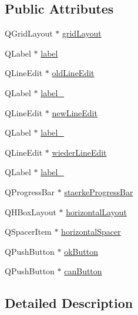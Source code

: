 \subsection*{Public Attributes}
\begin{CompactItemize}
\item 
QGridLayout $\ast$ \hyperlink{class_ui___password_change_dialog_class_69b4119ff485b44f00df3cc875fa50da}{gridLayout}
\item 
QLabel $\ast$ \hyperlink{class_ui___password_change_dialog_class_71666212d2d80702e6b969dc33c393b8}{label}
\item 
QLineEdit $\ast$ \hyperlink{class_ui___password_change_dialog_class_26d6536800b17c940fd5615bd95571cc}{oldLineEdit}
\item 
QLabel $\ast$ \hyperlink{class_ui___password_change_dialog_class_8410473d9dcbb97d5336fdd3988c51a3}{label\_}
\item 
QLineEdit $\ast$ \hyperlink{class_ui___password_change_dialog_class_55f7bf56874085aeedb237ba5817b604}{newLineEdit}
\item 
QLabel $\ast$ \hyperlink{class_ui___password_change_dialog_class_083fbd918362f9d06d4909f8448d6695}{label\_}
\item 
QLineEdit $\ast$ \hyperlink{class_ui___password_change_dialog_class_364db9f3e381caa97d43b4f902ebfdb5}{wiederLineEdit}
\item 
QLabel $\ast$ \hyperlink{class_ui___password_change_dialog_class_3480bfcab84a0179f30f05f2b06efe35}{label\_}
\item 
QProgressBar $\ast$ \hyperlink{class_ui___password_change_dialog_class_e88142a3552424957b5d73ed445d824e}{staerkeProgressBar}
\item 
QHBoxLayout $\ast$ \hyperlink{class_ui___password_change_dialog_class_3b41b6252f3602ab1cb67f958ed87c5e}{horizontalLayout}
\item 
QSpacerItem $\ast$ \hyperlink{class_ui___password_change_dialog_class_c0836409454080446b32ea2f1e7375f3}{horizontalSpacer}
\item 
QPushButton $\ast$ \hyperlink{class_ui___password_change_dialog_class_2452c6e8211eb599dc99f288d1bcde72}{okButton}
\item 
QPushButton $\ast$ \hyperlink{class_ui___password_change_dialog_class_f84b71a78950336e1c5dad8189c6f9d4}{canButton}
\end{CompactItemize}


\subsection{Detailed Description}


